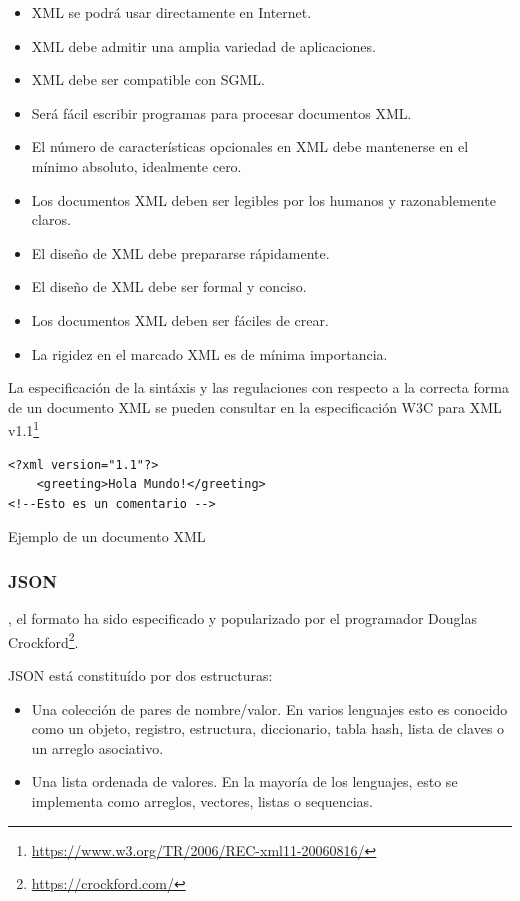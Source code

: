 \begin{itemize}
    \item XML se podrá usar directamente en Internet.
    \item XML debe admitir una amplia variedad de aplicaciones.
    \item XML debe ser compatible con SGML.
    \item Será fácil escribir programas para procesar documentos XML.
    \item El número de características opcionales en XML debe mantenerse en el mínimo absoluto, idealmente cero.
    \item Los documentos XML deben ser legibles por los humanos y razonablemente claros.
    \item El diseño de XML debe prepararse rápidamente.
    \item El diseño de XML debe ser formal y conciso.
    \item Los documentos XML deben ser fáciles de crear.
    \item La rigidez en el marcado XML es de mínima importancia.
\end{itemize}

La especificación de la sintáxis y las regulaciones con respecto a la correcta forma de un documento XML se pueden consultar en la especificación W3C para XML v1.1\footnote{\url{https://www.w3.org/TR/2006/REC-xml11-20060816/}}

\begin{verbatim}
<?xml version="1.1"?> 
    <greeting>Hola Mundo!</greeting> 
<!--Esto es un comentario -->
\end{verbatim}
\begin{center}
    \caption{Ejemplo de un documento XML}    
\end{center}



\subsubsection{JSON}
 \citep{Zunke2014}, el formato ha sido especificado y popularizado por el programador Douglas Crockford\footnote{\url{https://crockford.com/}}.

JSON está constituído por dos estructuras:

\begin{itemize}
    \item Una colección de pares de nombre/valor. En varios lenguajes esto es conocido como un objeto, registro, estructura, diccionario, tabla hash, lista de claves o un arreglo asociativo.
    \item Una lista ordenada de valores. En la mayoría de los lenguajes, esto se implementa como arreglos, vectores, listas o sequencias.
\end{itemize}

